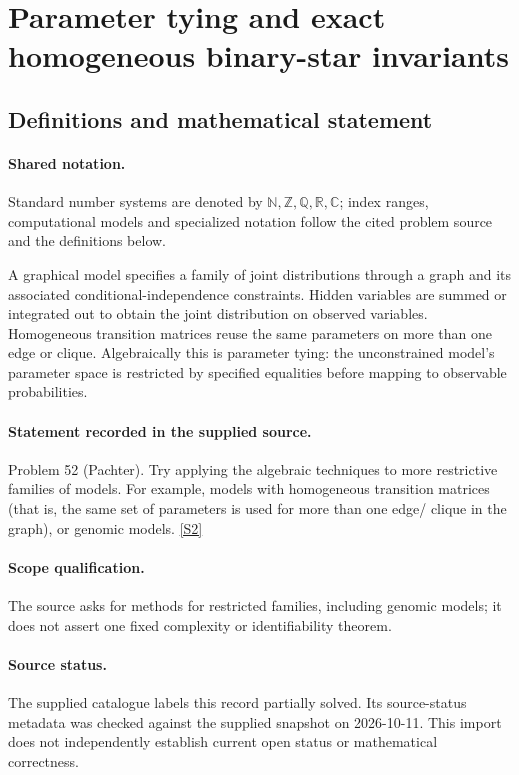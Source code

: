 \documentclass[11pt]{article}
\newcommand{\sref}[2]{\hyperlink{source:#1:#2}{[S#2]}}
\begin{document}
\section{Parameter tying and exact homogeneous binary-star invariants}\label{statement}

\subsection{Definitions and mathematical statement}

\paragraph{Shared notation.}Standard number systems are denoted by $\mathbb N,\mathbb Z,\mathbb Q,\mathbb R,\mathbb C$; index ranges, computational models and specialized notation follow the cited problem source and the definitions below.


A graphical model specifies a family of joint distributions through a graph and its associated conditional-independence constraints. Hidden variables are summed or integrated out to obtain the joint distribution on observed variables. Homogeneous transition matrices reuse the same parameters on more than one edge or clique. Algebraically this is parameter tying: the unconstrained model's parameter space is restricted by specified equalities before mapping to observable probabilities.
\paragraph{Statement recorded in the supplied source.}
Problem 52 (Pachter). Try applying the algebraic techniques to more restrictive families of models. For example, models with homogeneous transition matrices (that is, the same set of parameters is used for more than one edge/ clique in the graph), or genomic models. \sref{statement}{2}
\paragraph{Scope qualification.}
The source asks for methods for restricted families, including genomic models; it does not assert one fixed complexity or identifiability theorem.
\paragraph{Source status.}
The supplied catalogue labels this record partially solved. Its source-status metadata was checked against the supplied snapshot on 2026-10-11. This import does not independently establish current open status or mathematical correctness.
\end{document}

